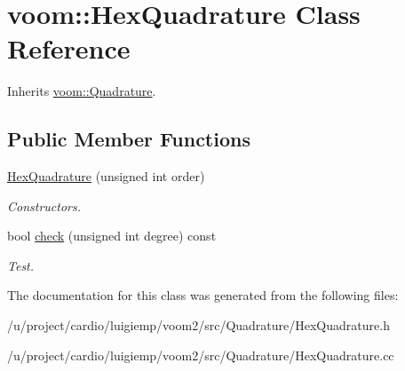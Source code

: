 \hypertarget{classvoom_1_1_hex_quadrature}{
\section{voom::HexQuadrature Class Reference}
\label{classvoom_1_1_hex_quadrature}
}


Inherits \hyperlink{classvoom_1_1_quadrature}{voom::Quadrature}.\subsection*{Public Member Functions}
\begin{DoxyCompactItemize}
\item 
\hypertarget{classvoom_1_1_hex_quadrature_a0585fe7f1af2186daff6bbde8aa6df69}{
\hyperlink{classvoom_1_1_hex_quadrature_a0585fe7f1af2186daff6bbde8aa6df69}{HexQuadrature} (unsigned int order)}
\label{classvoom_1_1_hex_quadrature_a0585fe7f1af2186daff6bbde8aa6df69}

\begin{DoxyCompactList}\small\item\em Constructors. \item\end{DoxyCompactList}\item 
\hypertarget{classvoom_1_1_hex_quadrature_a981bb4b1fa414c34bab3adf12734687a}{
bool \hyperlink{classvoom_1_1_hex_quadrature_a981bb4b1fa414c34bab3adf12734687a}{check} (unsigned int degree) const }
\label{classvoom_1_1_hex_quadrature_a981bb4b1fa414c34bab3adf12734687a}

\begin{DoxyCompactList}\small\item\em Test. \item\end{DoxyCompactList}\end{DoxyCompactItemize}


The documentation for this class was generated from the following files:\begin{DoxyCompactItemize}
\item 
/u/project/cardio/luigiemp/voom2/src/Quadrature/HexQuadrature.h\item 
/u/project/cardio/luigiemp/voom2/src/Quadrature/HexQuadrature.cc\end{DoxyCompactItemize}
